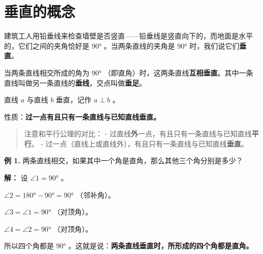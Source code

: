 \section*{垂直的概念}


\begin{explore}


建筑工人用铅垂线来检查墙壁是否竖直——铅垂线是竖直向下的，而地面是水平的，它们之间的夹角恰好是 $90°$ 。当两条直线的夹角是 $90°$ 时，我们说它们\textbf{垂直}。

\end{explore}

\begin{understand}


当两条直线相交所成的角为 $90°$ （即直角）时，这两条直线\textbf{互相垂直}。其中一条直线叫做另一条直线的\textbf{垂线}，交点叫做\textbf{垂足}。

直线 $a$ 与直线 $b$ 垂直，记作 $a \perp b$ 。

\begin{center}
\label{fig:perpendicular}
\end{center}


性质：\textbf{过一点有且只有一条直线与已知直线垂直。}

\end{understand}

\begin{quote}
注意和平行公理的对比：
- 过直线\textbf{外}一点，有且只有一条直线与已知直线\textbf{平行}。
- 过一点（直线上或直线外），有且只有一条直线与已知直线\textbf{垂直}。
\end{quote}


\begin{workedexamples}


\textbf{例 1.} 两条直线相交，如果其中一个角是直角，那么其他三个角分别是多少？

\textbf{解：}
设 $\angle 1 = 90°$ 。

$\angle 2 = 180° - 90° = 90°$ （邻补角）。

$\angle 3 = \angle 1 = 90°$ （对顶角）。

$\angle 4 = \angle 2 = 90°$ （对顶角）。

所以四个角都是 $90°$ 。这就是说：\textbf{两条直线垂直时，所形成的四个角都是直角。}

\end{workedexamples}

